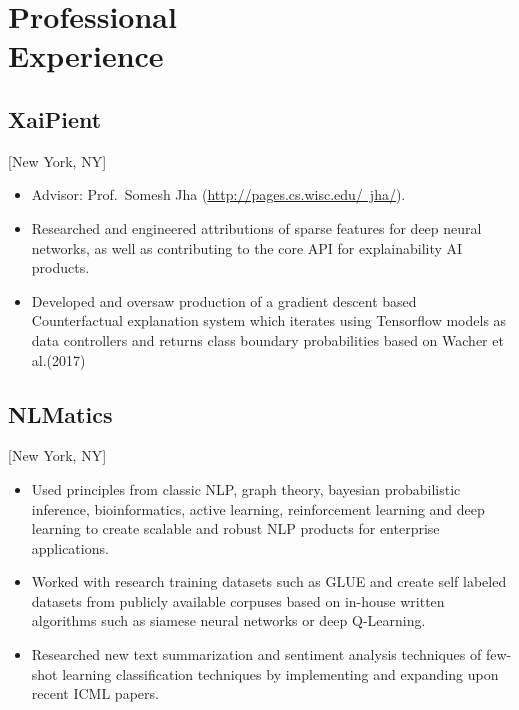 \documentclass{rkim-resume}
\begin{document}
\maketitle%

\section{Professional \\ Experience}

\subsection{XaiPient}[New York, NY]
\begin{positions}
\end{positions}

\begin{itemize}
  \item Advisor: Prof.~Somesh Jha (\href{http://pages.cs.wisc.edu/~jha/}{http://pages.cs.wisc.edu/~jha/}).
  \item Researched and engineered attributions of sparse features for deep neural networks, as well as contributing to the core API for explainability AI products.
  \item Developed and oversaw production of a gradient descent based Counterfactual explanation system which iterates using Tensorflow models as data controllers and returns class boundary probabilities based on Wacher et al.(2017)
\end{itemize}

\subsection{NLMatics}[New York, NY]
\begin{positions}
\end{positions}

\begin{itemize}
  \item Used principles from classic NLP, graph theory, bayesian probabilistic inference, bioinformatics, active learning, reinforcement learning and deep
learning to create scalable and robust NLP products for enterprise applications.
  \item Worked with research training datasets such as GLUE and create self labeled datasets from publicly available corpuses based on in-house written algorithms such as siamese neural networks or deep Q-Learning.
  \item Researched new text summarization and sentiment analysis techniques of few-shot learning classification techniques by implementing and expanding upon recent ICML papers.
\end{itemize}
\end{document}
